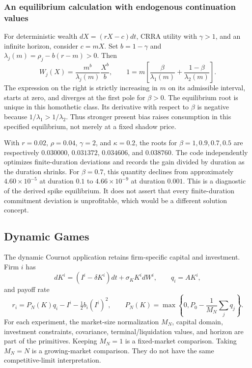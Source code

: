 \documentclass[ecta,nameyear,draft]{econsocart}
\theoremstyle{definition}
\theoremstyle{remark}
\begin{document}
\subsubsection{An equilibrium calculation with endogenous continuation values}
For deterministic wealth $dX=(rX-c)dt$, CRRA utility with $\gamma>1$, and an infinite horizon, consider $c=mX$. Set $b=1-\gamma$ and $\lambda_j(m)=\rho_j-b(r-m)>0$. Then
\begin{equation}\label{eq:temporalroot}
 W_j(X)=\frac{m^b}{\lambda_j(m)}\frac{X^b}{b},\qquad
 1=m\left[\frac\beta{\lambda_1(m)}+\frac{1-\beta}{\lambda_2(m)}\right].
\end{equation}
The expression on the right is strictly increasing in $m$ on its admissible interval, starts at zero, and diverges at the first pole for $\beta>0$. The equilibrium root is unique in this homothetic class. Its derivative with respect to $\beta$ is negative because $1/\lambda_1>1/\lambda_2$. Thus stronger present bias raises consumption in this specified equilibrium, not merely at a fixed shadow price.

With $r=0.02$, $\rho=0.04$, $\gamma=2$, and $\kappa=0.2$, the roots for $\beta=1,0.9,0.7,0.5$ are respectively $0.030000$, $0.031372$, $0.034606$, and $0.038760$. The code independently optimizes finite-duration deviations and records the gain divided by duration as the duration shrinks. For $\beta=0.7$, this quantity declines from approximately $4.60\times10^{-5}$ at duration $0.1$ to $4.66\times10^{-9}$ at duration $0.001$. This is a diagnostic of the derived spike equilibrium. It does not assert that every finite-duration commitment deviation is unprofitable, which would be a different solution concept.

\subsection{Dynamic Games}\label{sec:games}
The dynamic Cournot application retains firm-specific capital and investment. Firm $i$ has
\[
 dK^i=(I^i-\delta K^i)dt+\sigma_K K^i dW^i,\qquad q_i=AK^i,
\]
and payoff rate
\[
 r_i=P_N(K)q_i-I^i-\tfrac12 b_i(I^i)^2,\qquad
 P_N(K)=\max\left\{0,P_0-\frac1{M_N}\sum_jq_j\right\}.
\]
For each experiment, the market-size normalization $M_N$, capital domain, investment constraints, covariance, terminal/liquidation values, and horizon are part of the primitives. Keeping $M_N=1$ is a fixed-market comparison. Taking $M_N=N$ is a growing-market comparison. They do not have the same competitive-limit interpretation.
\end{document}
